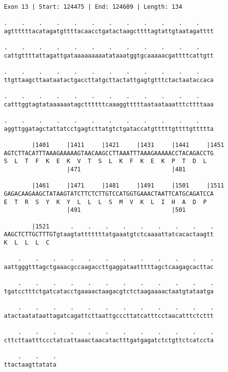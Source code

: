 \documentclass{article}
\begin{document}
\begin{Verbatim}
Exon 13 | Start: 124475 | End: 124609 | Length: 134
 
.    .    .    .    .    .    .    .    .    .    .    .    
agttttttacatagatgttttacaacctgatactaagcttttagtattgtaatagatttt
  
.    .    .    .    .    .    .    .    .    .    .    .    
cattgttttattagattgataaaaaaaaatataaatggtgcaaaaacgattttcattgtt
  
.    .    .    .    .    .    .    .    .    .    .    .    
ttgttaagcttaataatactgaccttatgcttactattgagtgtttctactaataccaca
  
.    .    .    .    .    .    .    .    .    .    .    .    
catttggtagtataaaaaatagcttttttcaaaggtttttaataataaatttcttttaaa
  
.    .    .    .    .    .    .    .    .    .    .    .    
aggttggatagctattatcctgagtcttatgtctgataccatgtttttgttttgttttta
  
        |1401     |1411     |1421     |1431     |1441     |1451
AGTCTTACATTTAAAGAAAAAGTAACAAGCCTTAAATTTAAAGAAAAACCTACAGACCTG
S  L  T  F  K  E  K  V  T  S  L  K  F  K  E  K  P  T  D  L  
                  |471                          |481        
  
        |1461     |1471     |1481     |1491     |1501     |1511
GAGACAAGAAGCTATAAGTATCTTCTCTTGTCCATGGTGAAACTAATTCATGCAGATCCA
E  T  R  S  Y  K  Y  L  L  L  S  M  V  K  L  I  H  A  D  P  
                  |491                          |501        
  
        |1521      .    .    .    .    .    .    .    .    .
AAGCTCTTGCTTTGTgtaagtatttttttatgaaatgtctcaaaattatcacactaagtt
K  L  L  L  C                                               
  
    .    .    .    .    .    .    .    .    .    .    .    .
aattgggtttagctgaaacgccaagaccttgaggataatttttagctcaagagcacttac
  
    .    .    .    .    .    .    .    .    .    .    .    .
tgatcctttctgatcatacctgaaaactaagacgtctctaagaaaactaatgtataatga
  
    .    .    .    .    .    .    .    .    .    .    .    .
atactaatataattagatcagattcttaattgcccttatcatttcctaacatttctcttt
  
    .    .    .    .    .    .    .    .    .    .    .    .
cttcttaatttccctatcattaaactaacatactttgatgagatctctgttctcatccta
  
    .    .    .
ttactaagttatata
\end{Verbatim}
\newpage
\end{document}
